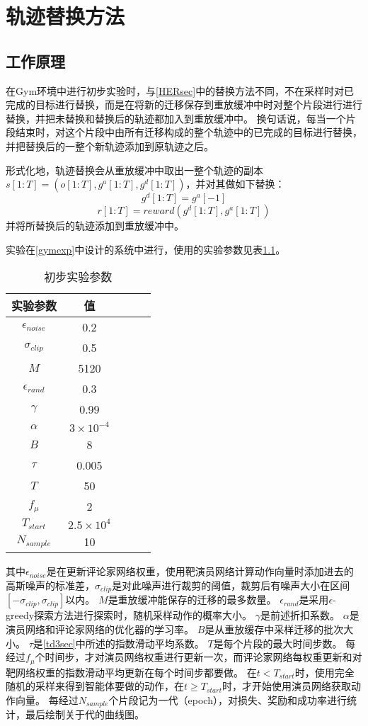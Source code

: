 \chapter{轨迹替换方法}

\section{工作原理}
在Gym环境中进行初步实验时，与\ref{HERsec}中的替换方法不同，不在采样时对已完成的目标进行替换，而是在将新的迁移保存到重放缓冲中时对整个片段进行进行替换，并把未替换和替换后的轨迹都加入到重放缓冲中。
换句话说，每当一个片段结束时，对这个片段中由所有迁移构成的整个轨迹中的已完成的目标进行替换，并把替换后的一整个新轨迹添加到原轨迹之后。

形式化地，轨迹替换会从重放缓冲中取出一整个轨迹的副本$s[1:T]=(o[1:T], g^a[1:T], g^d[1:T])$，并对其做如下替换：
$$g^d[1:T]=g^a[-1]$$
$$r[1:T]=reward(g^d[1:T], g^a[1:T])$$
并将所替换后的轨迹添加到重放缓冲中。

实验在\ref{gymexp}中设计的系统中进行，使用的实验参数见表\ref{pretable}。
    \begin{table}[htbp]
        \caption{初步实验参数}
        \label{pretable}
    \vspace{0.5em}\centering\wuhao
    \begin{tabular}{ccccc}
    \toprule[1.5pt]
    实验参数 & 值\\
    \midrule[1pt]
        $\epsilon_{noise}$ & 0.2\\
        $\sigma_{clip}$ & 0.5\\
        $M$ & 5120\\
        $\epsilon_{rand}$ & 0.3\\
        $\gamma$ & 0.99\\
        $\alpha$ & $3\times 10^{-4}$\\
        $B$ & 8\\
        $\tau$ & 0.005\\
        $T$ & 50\\
        $f_\mu$ & 2\\
        $T_{start}$ & $2.5\times 10^4$\\
        $N_{sample}$ & 10 \\
    \bottomrule[1.5pt]
    \end{tabular}
    \end{table}
    其中$\epsilon_{noise}$是在更新评论家网络权重，使用靶演员网络计算动作向量时添加进去的高斯噪声的标准差，$\sigma_{clip}$是对此噪声进行裁剪的阈值，裁剪后有噪声大小在区间$[-\sigma_{clip},\sigma_{clip}]$以内。
    $M$是重放缓冲能保存的迁移的最多数量。
    $\epsilon_{rand}$是采用$\epsilon$-greedy探索方法进行探索时，随机采样动作的概率大小。
    $\gamma$是前述折扣系数。
    $\alpha$是演员网络和评论家网络的优化器的学习率。
    $B$是从重放缓存中采样迁移的批次大小。
    $\tau$是\ref{td3sec}中所述的指数滑动平均系数。
    $T$是每个片段的最大时间步数。
    每经过$f_\mu$个时间步，才对演员网络权重进行更新一次，而评论家网络每权重更新和对靶网络权重的指数滑动平均更新在每个时间步都要做。
    在$t<T_{start}$时，使用完全随机的采样来得到智能体要做的动作，在$t\geq T_{start}$时，才开始使用演员网络获取动作向量。
    每经过$N_{sample}$个片段记为一代（epoch），对损失、奖励和成功率进行统计，最后绘制关于代的曲线图。


